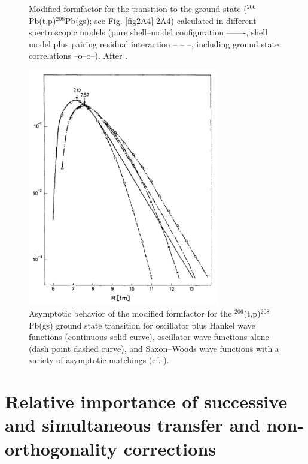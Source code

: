 \begin{subappendices}
\begin{figure}[h!]
\begin{center}
\end{center}\caption{Modified formfactor for the transition to the ground state ($^{206}$Pb(t,p)$^{208}$Pb(gs); see Fig. \ref{fig2A4} 2A4) calculated in different spectroscopic models (pure shell--model configuration -------, shell model  plus pairing residual interaction -- -- --, including ground state correlations --o--o--). After \cite{Broglia:67}.}\label{figC7B3}
\end{figure}
 \begin{figure}[h!]
 	\begin{center}
\includegraphics*[width=0.75\textwidth]{C7/figs_C7/figC7B4}
\end{center}\caption{Asymptotic behavior of the modified formfactor for the $^{206}$(t,p)$^{208}$Pb(gs) ground state transition for oscillator plus Hankel wave functions (continuous solid curve), oscillator wave functions alone (dash point dashed curve), and Saxon--Woods wave functions with a variety of asymptotic matchings (cf. \cite{Broglia:67}).}\label{figC7B4}
\end{figure}
\section[Succesive, simultaneous, non--orthogonality]{Relative importance of successive and simultaneous transfer and non-orthogonality corrections}\label{C7AppC}


\end{subappendices}
